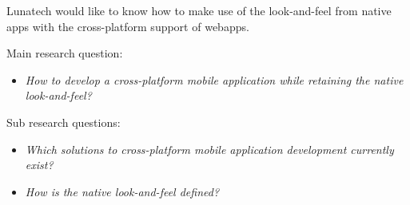 Lunatech would like to know how to make use of the look-and-feel from native apps with the cross-platform support of webapps.


Main research question:
\begin{itemize}
\item \emph{How to develop a cross-platform mobile application while retaining the native look-and-feel?}
\end{itemize}

\noindent Sub research questions:
\begin{itemize}
\item \emph{Which solutions to cross-platform mobile application development currently exist?}
\item \emph{How is the native look-and-feel defined?}
\end{itemize}